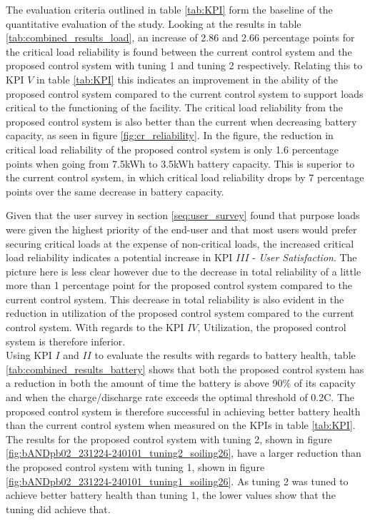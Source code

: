 The evaluation criteria outlined in table \ref{tab:KPI} form the baseline of the quantitative evaluation of the study. Looking at the results in table \ref{tab:combined_results_load}, an increase of 2.86  and 2.66 percentage points for the critical load reliability is found between the current control system and the proposed control system with tuning 1 and tuning 2 respectively. Relating this to KPI $V$ in table \ref{tab:KPI} this indicates an improvement in the ability of the proposed control system compared to the current control system to support loads critical to the functioning of the facility. The critical load reliability from the proposed control system is also better than the current when decreasing battery capacity, as seen in figure \ref{fig:cr_reliability}. In the figure, the reduction in critical load reliability of the proposed control system is only 1.6 percentage points when going from 7.5kWh to 3.5kWh battery capacity. This is superior to the current control system, in which critical load reliability drops by 7 percentage points over the same decrease in battery capacity.  

Given that the user survey in section \ref{seq:user_survey} found that purpose loads were given the highest priority of the end-user and that most users would prefer securing critical loads at the expense of non-critical loads, the increased critical load reliability indicates a potential increase in KPI $III$ - \textit{User Satisfaction}. The picture here is less clear however due to the decrease in total reliability of a little more than 1 percentage point for the proposed control system compared to the current control system. This decrease in total reliability is also evident in the reduction in utilization of the proposed control system compared to the current control system. With regards to the KPI $IV$, Utilization, the proposed control system is therefore inferior.\\

Using KPI $I$ and $II$ to evaluate the results with regards to battery health, table \ref{tab:combined_results_battery} shows that both the proposed control system has a reduction in both the amount of time the battery is above 90$\%$ of its capacity and when the charge/discharge rate exceeds the optimal threshold of 0.2C. The proposed control system is therefore successful in achieving better battery health than the current control system when measured on the KPIs in table \ref{tab:KPI}. The results for the proposed control system with tuning 2, shown in figure \ref{fig:bANDpb02_231224-240101_tuning2_soiling26}, have a larger reduction than the proposed control system with tuning 1, shown in figure \ref{fig:bANDpb02_231224-240101_tuning1_soiling26}. As tuning 2 was tuned to achieve better battery health than tuning 1, the lower values show that the tuning did achieve that.\\

